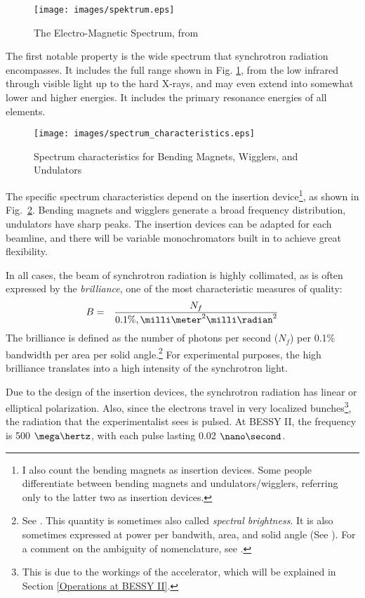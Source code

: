 \documentclass[a4paper,10pt]{article}
\begin{document}
\begin{figure}[htbp]
    \centering
    \texttt{[image: images/spektrum.eps]}
    \caption{The Electro-Magnetic Spectrum, from
\citep{attwoodlecture}}
  \label{image:spektrum}
\end{figure}

    The first notable property is the wide spectrum that synchrotron radiation
encompasses. It includes the full range shown in Fig. \ref{image:spektrum}, from
the low infrared through visible light up to the hard X-rays, and may even
extend into somewhat lower and higher energies. It includes the primary
resonance energies of all elements.

\begin{figure}[htbp]
    \centering
\texttt{[image: images/spectrum\_characteristics.eps]}
    \caption{Spectrum characteristics for Bending Magnets, Wigglers, and
Undulators}
  \label{image:spectrum_characteristics}
\end{figure}

    The specific spectrum characteristics depend on the insertion
device\footnote{I also count the bending magnets as insertion devices. Some
people differentiate between bending magnets and undulators/wigglers, referring
only to the latter two as insertion devices.}, as
shown in Fig.~\ref{image:spectrum_characteristics}. Bending magnets and wigglers
generate a broad frequency distribution, undulators have sharp peaks. The
insertion devices can be adapted for each beamline, and there will be
variable monochromators built in to achieve great flexibility.

    In all cases, the beam of synchrotron radiation is highly collimated, as is
often expressed by the \emph{brilliance}, one of the most characteristic
measures of quality:
\begin{eqnarray}
  B &=& \frac{N_f}{0.1\%, \milli\meter^2 \milli\radian^2}
\end{eqnarray}
The brilliance is defined as the number of photons per second ($N_f$) per 0.1\%
bandwidth per area per solid angle.\footnote{
See \citep{eriksson1997}. This
quantity is sometimes also called \emph{spectral brightness}. It is also
sometimes expressed at power per bandwith, area, and solid angle (See
\citep{attwood2000}). For a comment on the ambiguity of nomenclature, see
\citep{mills2005}.
} For experimental purposes, the high brilliance translates
into a high intensity of the synchrotron light.

    Due to the design of the insertion devices, the synchrotron radiation has
linear or elliptical polarization. Also, since the electrons travel in very
localized bunches\footnote{This is due to the workings of the accelerator, which
will be explained in Section \ref{Operations at BESSY II}.}, the radiation that
the experimentalist sees is pulsed. At BESSY II, the frequency is 500
$\mega\hertz$, with each pulse lasting 0.02 $\nano\second$.
\end{document}
